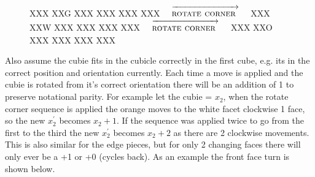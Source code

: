\documentclass{article}
\begin{document}
\newcommand{\rotatecorner}{[rotatecorner],F2,F2}%
\newcommand{\rotatecornerarr}{$\quad\overrightarrow{\strut\textsc{rotate corner }}\quad$}
\begin{figure}[hbt]
\centering
  \RubikCubeSolved%
   {X}{X}{X} {X}{X}{G}%
   {X}{X}{X} {X}{X}{X}%
   {X}{X}{X} {X}{X}{X}%
  \rotatecornerarr
  \RubikRotation{\rotatecorner}
   {X}{X}{X} {X}{X}{W}%
   {X}{X}{X} {X}{X}{X}%
   {X}{X}{X} {X}{X}{X}%
  \rotatecornerarr
   {X}{X}{X} {X}{X}{O}%
   {X}{X}{X} {X}{X}{X}%
   {X}{X}{X} {X}{X}{X}%
\end{figure}
\vspace{20pt}
Also assume the cubie fits in the cubicle correctly in the first cube, e.g. its in the correct position and orientation currently. Each time a move is applied and the cubie is rotated from it's correct orientation there will be an addition of 1 to preserve notational parity. For example let the cubie = $x_2$, when the rotate corner sequence is applied the orange moves to the white facet clockwise 1 face, so the new $x_2^{'}$ becomes $x_2 + 1$. If the sequence was applied twice to go from the first to the third the new $x_2^{'}$ becomes $x_2 + 2$ as there are 2 clockwise movements. This is also similar for the edge pieces, but for only 2 changing faces there will only ever be a +1 or +0 (cycles back).
As an example the front face turn is shown below.

\end{document}
